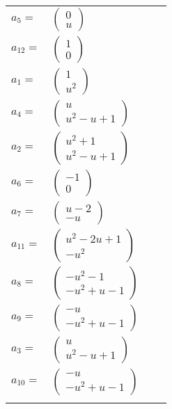 \documentclass[1p]{elsarticle_modified}
\theoremstyle{definition}
\begin{document}
\begin{tabular}{m{7pt} m{180pt} m{7pt} m{180pt} }
\flushright $a_{5}=$&$\begin{pmatrix}0\\u\end{pmatrix}$ \\
\flushright $a_{12}=$&$\begin{pmatrix}1\\0\end{pmatrix}$ \\
\flushright $a_{1}=$&$\begin{pmatrix}1\\u^2\end{pmatrix}$ \\
\flushright $a_{4}=$&$\begin{pmatrix}u\\u^2- u+1\end{pmatrix}$ \\
\flushright $a_{2}=$&$\begin{pmatrix}u^2+1\\u^2- u+1\end{pmatrix}$ \\
\flushright $a_{6}=$&$\begin{pmatrix}-1\\0\end{pmatrix}$ \\
\flushright $a_{7}=$&$\begin{pmatrix}u-2\\- u\end{pmatrix}$ \\
\flushright $a_{11}=$&$\begin{pmatrix}u^2-2 u+1\\- u^2\end{pmatrix}$ \\
\flushright $a_{8}=$&$\begin{pmatrix}- u^2-1\\- u^2+u-1\end{pmatrix}$ \\
\flushright $a_{9}=$&$\begin{pmatrix}- u\\- u^2+u-1\end{pmatrix}$ \\
\flushright $a_{3}=$&$\begin{pmatrix}u\\u^2- u+1\end{pmatrix}$ \\
\flushright $a_{10}=$&$\begin{pmatrix}- u\\- u^2+u-1\end{pmatrix}$\\&\end{tabular}
\end{document}
